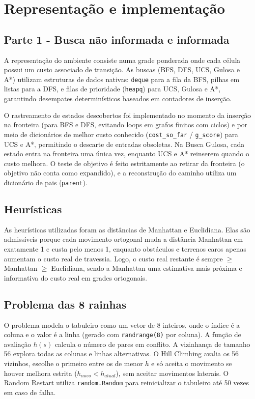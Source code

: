 \documentclass[12pt]{article}
\begin{document}
\section{Representação e implementação}
\subsection{Parte 1 - Busca não informada e informada}
A representação do ambiente consiste numa grade ponderada onde cada célula possui um custo associado de transição. As buscas (BFS, DFS, UCS, Gulosa e A*) utilizam estruturas de dados nativas: \texttt{deque} para a fila da BFS, pilhas em listas para a DFS, e filas de prioridade (\texttt{heapq}) para UCS, Gulosa e A*, garantindo desempates determinísticos baseados em contadores de inserção. 

O rastreamento de estados descobertos foi implementado no momento da inserção na fronteira (para BFS e DFS, evitando loops em grafos finitos com ciclos) e por meio de dicionários de melhor custo conhecido (\texttt{cost\_so\_far} / \texttt{g\_score}) para UCS e A*, permitindo o descarte de entradas obsoletas. Na Busca Gulosa, cada estado entra na fronteira uma única vez, enquanto UCS e A* reinserem quando o custo melhora. O teste de objetivo é feito estritamente ao retirar da fronteira (o objetivo não conta como expandido), e a reconstrução do caminho utiliza um dicionário de pais (\texttt{parent}).

\subsection{Heurísticas}
As heurísticas utilizadas foram as distâncias de Manhattan e Euclidiana. Elas são admissíveis porque cada movimento ortogonal muda a distância Manhattan em exatamente 1 e custa pelo menos 1, enquanto obstáculos e terrenos caros apenas aumentam o custo real de travessia. Logo, o custo real restante é sempre $\ge$ Manhattan $\ge$ Euclidiana, sendo a Manhattan uma estimativa mais próxima e informativa do custo real em grades ortogonais.

\subsection{Problema das 8 rainhas}
O problema modela o tabuleiro como um vetor de 8 inteiros, onde o índice é a coluna e o valor é a linha (gerado com \texttt{randrange(8)} por coluna). A função de avaliação $h(s)$ calcula o número de pares em conflito. A vizinhança de tamanho 56 explora todas as colunas e linhas alternativas. O Hill Climbing avalia os 56 vizinhos, escolhe o primeiro entre os de menor $h$ e só aceita o movimento se houver melhora estrita ($h_{novo} < h_{atual}$), sem aceitar movimentos laterais. O Random Restart utiliza \texttt{random.Random} para reinicializar o tabuleiro até 50 vezes em caso de falha.
\end{document}
